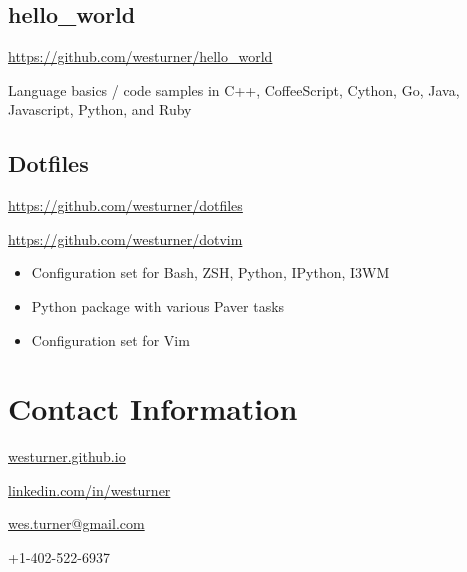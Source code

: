 \documentclass[letter,,openany,oneside]{sphinxhowto}
\begin{document}
\subsection{hello\_world}
\label{resume:hello-world}
\begin{DUlineblock}{0em}
\item[] \href{https://github.com/westurner/hello\_world}{https://github.com/westurner/hello\_world}
\end{DUlineblock}

Language basics / code samples in C++, CoffeeScript, Cython, Go, Java, Javascript, Python, and Ruby


\subsection{Dotfiles}
\label{resume:dotfiles}
\begin{DUlineblock}{0em}
\item[] \href{https://github.com/westurner/dotfiles}{https://github.com/westurner/dotfiles}
\item[] \href{https://github.com/westurner/dotvim}{https://github.com/westurner/dotvim}
\end{DUlineblock}
\begin{itemize}
\item {} 
Configuration set for Bash, ZSH, Python, IPython, I3WM

\item {} 
Python package with various Paver tasks

\item {} 
Configuration set for Vim

\end{itemize}


\section{Contact Information}
\label{resume:contact-information}
\begin{DUlineblock}{0em}
\item[] \href{http://westurner.github.io}{westurner.github.io}
\item[] \href{http://www.linkedin.com/in/westurner}{linkedin.com/in/westurner}
\item[] \href{mailto:wes.turner@gmail.com}{wes.turner@gmail.com}
\item[] +1-402-522-6937
\end{DUlineblock}



\renewcommand{\indexname}{Index}
\end{document}
